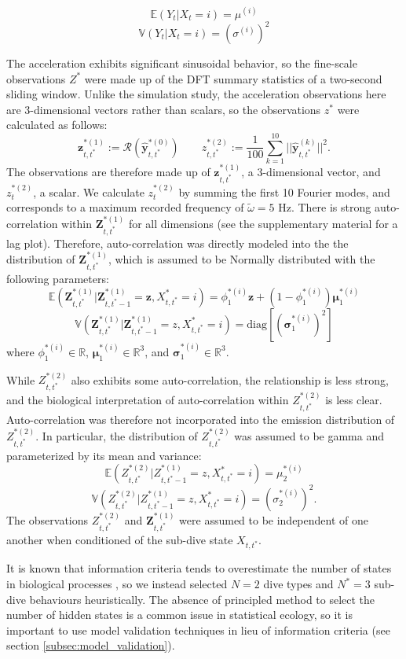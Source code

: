 $$\mathbb{E}(Y_t|X_t = i) = \mu^{(i)}$$
$$\mathbb{V}(Y_t|X_t = i) = \left(\sigma^{(i)}\right)^2$$

The acceleration exhibits significant sinusoidal behavior, so the fine-scale observations $Z^*$ were made up of the DFT summary statistics of a two-second sliding window. Unlike the simulation study, the acceleration observations here are 3-dimensional vectors rather than scalars, so the observations $z^*$ were calculated as follows:
%
$$\mathbf{z}_{t,t^*}^{*(1)} := \mathcal{R}\left(\hat{\mathbf{y}}^{*(0)}_{t,t^*}\right) \qquad z_{t,t^*}^{*(2)} := \frac{1}{100}\sum_{k=1}^{10}||\hat{\mathbf{y}}^{(k)}_{t,t^*}||^2.$$
%
The observations are therefore made up of $\mathbf{z}_{t,t^*}^{*(1)}$, a 3-dimensional vector, and $z_t^{*(2)}$, a scalar. We calculate $z_t^{*(2)}$ by summing the first 10 Fourier modes, and corresponds to a maximum recorded frequency of $\tilde \omega = 5$ Hz. There is strong auto-correlation within $\mathbf{Z}^{*(1)}_{t,t^*}$ for all dimensions (see the supplementary material for a lag plot). Therefore, auto-correlation was directly modeled into the the distribution of $\mathbf{Z}^{*(1)}_{t,t^*}$, which is assumed to be Normally distributed with the following parameters:
%
$$\mathbb{E}(\mathbf{Z}^{*(1)}_{t,t^*}|\mathbf{Z}^{*(1)}_{t,t^*-1} = \mathbf{z}, X^*_{t,t^*} = i) = \phi_1^{*(i)} \mathbf{z} + (1-\phi_1^{*(i)}) \mathbf{\mu}_1^{*(i)}$$
$$\mathbb{V}(\mathbf{Z}^{*(1)}_{t,t^*}|\mathbf{Z}^{*(1)}_{t,t^*-1} = z,X^*_{t,t^*} = i) = \text{diag}\left[\left(\mathbf{\sigma}_1^{*(i)}\right)^2\right]$$
%
where $\phi_1^{*(i)} \in \mathbb{R}$, $\mathbf{\mu}_1^{*(i)} \in \mathbb{R}^3$, and $\mathbf{\sigma}_1^{*(i)} \in \mathbb{R}^3$.

While $Z^{*(2)}_{t,t^*}$ also exhibits some auto-correlation, the relationship is less strong, and the biological interpretation of auto-correlation within $Z^{*(2)}_{t,t^*}$ is less clear. Auto-correlation was therefore not incorporated into the emission distribution of $Z^{*(2)}_{t,t^*}$. In particular, the distribution of $Z^{*(2)}_{t,t^*}$ was assumed to be gamma and parameterized by its mean and variance:
%
$$\mathbb{E}(Z^{*(2)}_{t,t^*}|Z^{*(1)}_{t,t^*-1} = z,X^*_{t,t^*} = i) = \mu_2^{*(i)}$$
$$\mathbb{V}(Z^{*(2)}_{t,t^*}|Z^{*(1)}_{t,t^*-1} = z,X^*_{t,t^*} = i) = \left(\sigma_2^{*(i)}\right)^2.$$
%
The observations $Z^{*(2)}_{t,t^*}$ and $\mathbf{Z}^{*(1)}_{t,t^*}$ were assumed to be independent of one another when conditioned of the sub-dive state $X_{t,t^*}$.

It is known that information criteria tends to overestimate the number of states in biological processes \citep{Pohle:2017}, so we instead selected $N = 2$ dive types and $N^* = 3$ sub-dive behaviours heuristically. The absence of principled method to select the number of hidden states is a common issue in statistical ecology, so it is important to use model validation techniques in lieu of information criteria (see section \ref{subsec:model_validation}).

